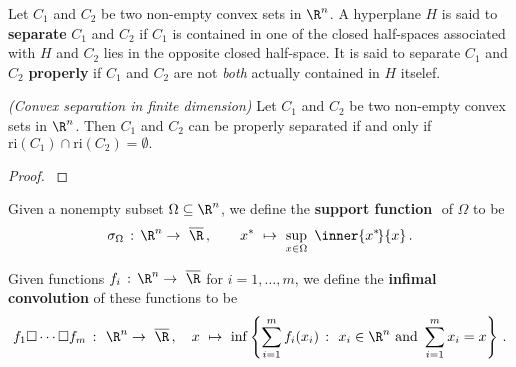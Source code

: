 \begin{definition*}
  Let 
  $C_1$ and $C_2$
  be two non-empty convex sets in $\R^n$. 
  A hyperplane $H$ is said to \textbf{separate}
  $C_1$ and $C_2$
  if $C_1$ is contained in one of the closed half-spaces associated with
  $H$ and $C_2$ lies in the opposite closed half-space. It is said to separate 
  $C_1$ and $C_2$
  \textbf{properly} if 
  $C_1$ and $C_2$
  are not \textit{both} actually contained in $H$ itselef.
\end{definition*}
\begin{ftheorem}
  \label{cv:primer:sep}
  \emph{(Convex separation in finite dimension)}
  Let $C_1$ and $C_2$ be two non-empty convex sets in $\R^n$. 
  Then $C_1$ and $C_2$ can be properly separated if and only if 
  $\mathrm{ri}(C_1)\cap\mathrm{ri}(C_2)=\emptyset.$
\end{ftheorem}
\begin{proof}
  \cite[Theorem~11.3]{Rockafellar1970}
\end{proof}




\begin{definition*}
  Given a nonempty subset 
  $\Omega \subseteq \R^n$,
  we define
  the \textbf{support function} 
  $
  $
  of $\Omega$
  to be
  \begin{gather*}
  \sigma_\Omega 
  \,
  :
  \,
  \R^n \to\  \overline{\R}
  \,,
  \qquad
  x^*
  \ 
  \mapsto
  \ 
    \sup_{x \in \Omega}
    \ 
    \inner{x^*\!}{x}
    \,.
  \end{gather*}
\end{definition*}


\begin{definition}
  Given functions
  $
    f_i\,:\,
    \R^n \to\  \overline{\R}
  $
  for $ i = 1, \ldots, m $,
  we define the \textbf{infimal convolution} of these functions to be
  \begin{gather*}
    f_1 \square \cdots \square f_m
    \ 
    \colon
    \ 
    \R^n
    \to
    \ 
    \overline{\R}
    \,,
    \quad
    x
    \ 
    \mapsto
    \ 
    \inf
    \left\{ 
    \sum_{i = 1}^{m}
      f_i(x_i)
      \ 
      \colon
      \ 
      x_i \in \R^n 
      \ 
      \mathrm{and}\ 
      \sum_{i = 1}^{m} 
        x_i
      =
      x
    \right\}
    \,.
  \end{gather*}
\end{definition}
 
